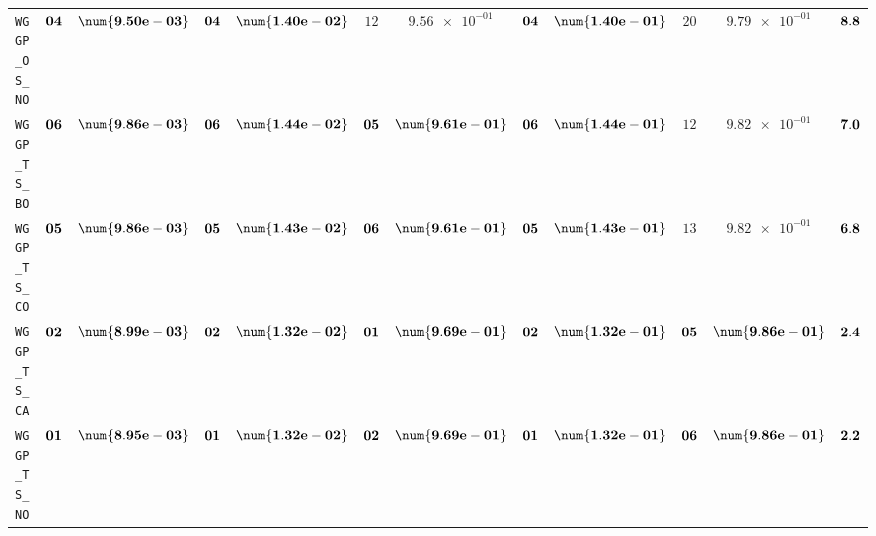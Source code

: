 \begin{table}[H]
\begin{tabularx}{\textwidth}{l||cC|cC|cC|cC|cC||c}
		\texttt{WGGP\_OS\_NO} & $\bf 04$ & $\bf \num{9.50e-03}$ & $\bf 04$ & $\bf \num{1.40e-02}$ & $ 12$ & $ \num{9.56e-01}$ & $\bf 04$ & $\bf \num{1.40e-01}$ & $ 20$ & $ \num{9.79e-01}$ & $\bf 8.8$  \\
		\texttt{WGGP\_TS\_BO} & $\bf 06$ & $\bf \num{9.86e-03}$ & $\bf 06$ & $\bf \num{1.44e-02}$ & $\bf 05$ & $\bf \num{9.61e-01}$ & $\bf 06$ & $\bf \num{1.44e-01}$ & $ 12$ & $ \num{9.82e-01}$ & $\bf 7.0$  \\
		\texttt{WGGP\_TS\_CO} & $\bf 05$ & $\bf \num{9.86e-03}$ & $\bf 05$ & $\bf \num{1.43e-02}$ & $\bf 06$ & $\bf \num{9.61e-01}$ & $\bf 05$ & $\bf \num{1.43e-01}$ & $ 13$ & $ \num{9.82e-01}$ & $\bf 6.8$  \\
		\texttt{WGGP\_TS\_CA} & $\bf 02$ & $\bf \num{8.99e-03}$ & $\bf 02$ & $\bf \num{1.32e-02}$ & $\bf 01$ & $\bf \num{9.69e-01}$ & $\bf 02$ & $\bf \num{1.32e-01}$ & $\bf 05$ & $\bf \num{9.86e-01}$ & $\bf 2.4$  \\
		\texttt{WGGP\_TS\_NO} & $\bf 01$ & $\bf \num{8.95e-03}$ & $\bf 01$ & $\bf \num{1.32e-02}$ & $\bf 02$ & $\bf \num{9.69e-01}$ & $\bf 01$ & $\bf \num{1.32e-01}$ & $\bf 06$ & $\bf \num{9.86e-01}$ & $\bf 2.2$  \\
	\end{tabularx}
\end{table}
